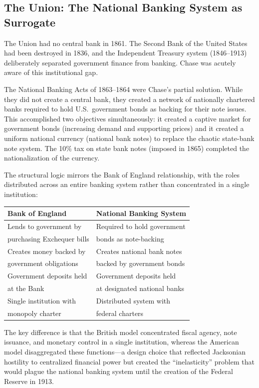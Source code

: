 \documentclass[12pt]{article}
\begin{document}
\subsection{The Union: The National Banking System as Surrogate}

The Union had no central bank in 1861. The Second Bank of the United
States had been destroyed in 1836, and the Independent Treasury system
(1846--1913) deliberately separated government finance from banking.
Chase was acutely aware of this institutional gap.

The National Banking Acts of 1863--1864 were Chase's partial solution.
While they did not create a central bank, they created a network of
nationally chartered banks required to hold U.S.\ government bonds as
backing for their note issues. This accomplished two objectives
simultaneously: it created a captive market for government bonds
(increasing demand and supporting prices) and it created a uniform
national currency (national bank notes) to replace the chaotic
state-bank note system. The 10\% tax on state bank notes (imposed in
1865) completed the nationalization of the currency.

The structural logic mirrors the Bank of England relationship, with the
roles distributed across an entire banking system rather than
concentrated in a single institution:

\begin{center}
\begin{tabular}{p{5cm}p{5cm}}
\toprule
\textbf{Bank of England} & \textbf{National Banking System} \\
\midrule
Lends to government by & Required to hold government \\
purchasing Exchequer bills & bonds as note-backing \\[0.5em]
Creates money backed by & Creates national bank notes \\
government obligations & backed by government bonds \\[0.5em]
Government deposits held & Government deposits held \\
at the Bank & at designated national banks \\[0.5em]
Single institution with & Distributed system with \\
monopoly charter & federal charters \\
\bottomrule
\end{tabular}
\end{center}

The key difference is that the British model concentrated fiscal agency,
note issuance, and monetary control in a single institution, whereas the
American model disaggregated these functions---a design choice that
reflected Jacksonian hostility to centralized financial power but
created the ``inelasticity'' problem that would plague the national
banking system until the creation of the Federal Reserve in 1913.
\end{document}
